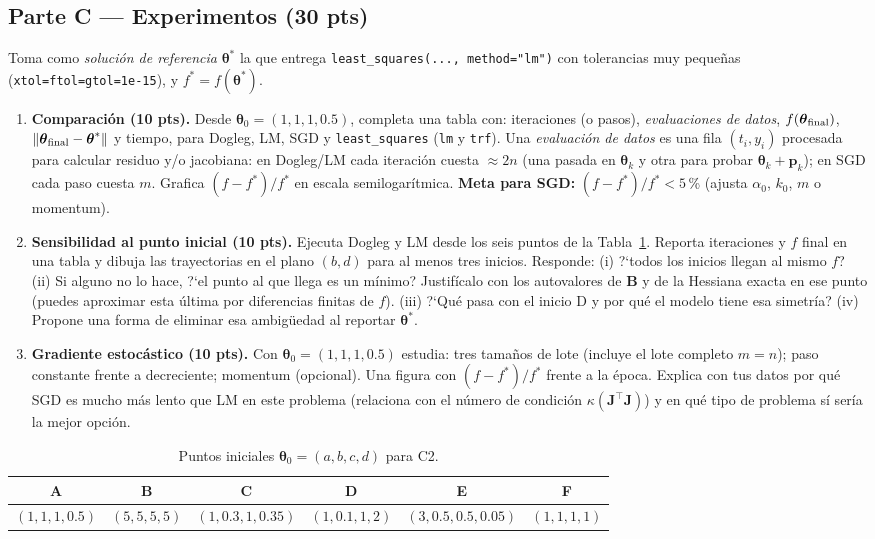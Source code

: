 \documentclass[11pt,letterpaper]{article}
\newcommand{\tht}{\boldsymbol{\theta}}
\newcommand{\Jm}{\mathbf{J}}
\newcommand{\pvec}{\mathbf{p}}
\newcommand{\norm}[1]{\left\lVert #1\right\rVert}
\begin{document}
\subsection*{Parte C --- Experimentos (30 pts)}
Toma como \emph{soluci\'on de referencia} $\tht^\ast$ la que entrega \texttt{least\_squares(..., method="lm")} con
tolerancias muy peque\~nas (\texttt{xtol=ftol=gtol=1e-15}), y $f^\ast=f(\tht^\ast)$.
\begin{enumerate}[label=C\arabic*.]
\item \textbf{Comparaci\'on (10 pts).} Desde $\tht_0=(1,1,1,0.5)$, completa una tabla con: iteraciones (o pasos),
\emph{evaluaciones de datos}, $f(\tht_{\rm final})$, $\norm{\tht_{\rm final}-\tht^\ast}$ y tiempo, para Dogleg, LM, SGD
y \texttt{least\_squares} (\texttt{lm} y \texttt{trf}). Una \emph{evaluaci\'on de datos} es una fila $(t_i,y_i)$
procesada para calcular residuo y/o jacobiana: en Dogleg/LM cada iteraci\'on cuesta $\approx 2n$ (una pasada en
$\tht_k$ y otra para probar $\tht_k+\pvec_k$); en SGD cada paso cuesta $m$. Grafica $(f-f^\ast)/f^\ast$ en escala
semilogar\'itmica. \textbf{Meta para SGD:} $(f-f^\ast)/f^\ast<5$\,\% (ajusta $\alpha_0$, $k_0$, $m$ o momentum).
\item \textbf{Sensibilidad al punto inicial (10 pts).} Ejecuta Dogleg y LM desde los seis puntos de la
Tabla~\ref{tab:inicios}. Reporta iteraciones y $f$ final en una tabla y dibuja las trayectorias en el plano
$(b,d)$ para al menos tres inicios. Responde: (i) ?`todos los inicios llegan al mismo $f$? (ii) Si alguno no
lo hace, ?`el punto al que llega es un m\'inimo? Justif\'icalo con los autovalores de $\mathbf B$ y de la Hessiana
exacta en ese punto (puedes aproximar esta \'ultima por diferencias finitas de $f$). (iii) ?`Qu\'e pasa con el inicio D y por qu\'e el modelo tiene esa simetr\'ia? (iv) Propone
una forma de eliminar esa ambig\"uedad al reportar $\tht^\ast$.
\item \textbf{Gradiente estoc\'astico (10 pts).} Con $\tht_0=(1,1,1,0.5)$ estudia: tres tama\~nos de lote
(incluye el lote completo $m=n$); paso constante frente a decreciente; momentum (opcional). Una figura con
$(f-f^\ast)/f^\ast$ frente a la \'epoca. Explica con tus datos por qu\'e SGD es mucho m\'as lento que LM en este
problema (relaciona con el n\'umero de condici\'on $\kappa(\Jm^\top\Jm)$) y en qu\'e tipo de problema s\'i ser\'ia la
mejor opci\'on.
\end{enumerate}

\begin{table}[h]
\centering
\caption{Puntos iniciales $\tht_0=(a,b,c,d)$ para C2.}
\label{tab:inicios}
\begin{tabular}{@{}cccccc@{}}
\toprule
A & B & C & D & E & F\\
\midrule
$(1,1,1,0.5)$ & $(5,5,5,5)$ & $(1,0.3,1,0.35)$ & $(1,0.1,1,2)$ & $(3,0.5,0.5,0.05)$ & $(1,1,1,1)$\\
\bottomrule
\end{tabular}
\end{table}
\end{document}
